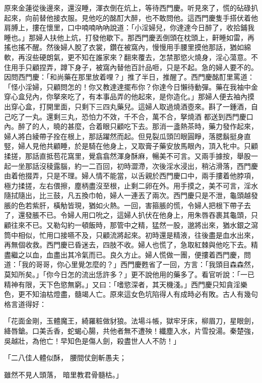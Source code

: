 原來金蓮從後邊來，還沒睡，渾衣倒在炕上，等待西門慶。听見來了，慌的砧碌扒起來，向前替他接衣服。見他吃的酩酊大醉，也不敢問他。這西門慶隻手搭伏着他肩膊上，摟在懷里，口中喃喃吶吶說道：「小淫婦兒，你達達今日醉了，收拾鋪我睡也。」那婦人扶他上炕，打發他歇下。那西門慶丟倒頭在枕頭上，鼾睡如雷，再搖也搖不醒。然後婦人脫了衣裳，鑽在被窩內，慢慢用手腰里摸他那話，猶如綿軟，再沒些硬朗氣，更不知在誰家來？翻來覆去，怎禁那慾火燒身，淫心蕩意。不住用手只顧捏弄，蹲下身子，被窩內替他百計品咂，只是不起。急的婦人要不的。因問西門慶：「和尚藥在那里放着哩？」推了半日，推醒了。西門慶酩酊里罵道：「怪小淫婦，只顧問怎的！你又教達達擺布你？你達今日懶待動彈。藥在我袖中金穿心盒兒內，你拏來吃了，有本事品弄的他起來，是你造化。」那婦人便去袖內摸出穿心盒，打開里面，只剩下三四丸藥兒。這婦人取過燒酒壺來。斟了一鍾酒，自己吃了一丸。還剩三丸，恐怕力不效，千不合，萬不合，拏燒酒 都送到西門慶口內。醉了的人，曉的甚麼，合着眼只顧吃下去。那消一盞熱茶時，藥力發作起來，婦人將白綾帶子拴在根上，那話躍然而起。但見裂瓜頭凹眼圓睜，落腮鬍挺身直竪，婦人見他共顧睡，於是騎在他身上，又取膏子藥安放馬眼內，頂入牝中。只顧揉搓，那話直抵苞花窩里，覺翕翕然渾身酥麻，暢美不可言。又兩手據按，舉股一起一坐那話沒稜露腦，約一二百回，初時澀滯，次後淫水浸出，稍沾滑落，西門慶由着他掇弄，只是不理。婦人情不能當，以舌親於西門慶口中，兩手摟着他脖項，極力揉搓，左右偎擦，塵柄盡沒至根，止剩二卵在外。用手摸之，美不可言，淫水隨拭隨出，比三鼓，凡五換巾帕，婦人一連丟了兩次。西門慶只是不泄，龜頭越發脹的色若紫肝，橫觔皆現，猶如火熱。一回，害箍脹的慌，令婦人把根下帶子去了，還發脹不已。令婦人用口吮之，這婦人扒伏在他身上，用朱唇吞裹其龜頭，只顧往來不已。又勒勾約一頓飯時，那管中之精，猛然一股，邈將出來，猶水銀之瀉筒中相似，忙用口接嚥不及，只顧流將起來。初時還是精液，往後盡是血水出來，再無個收救。西門慶已昏迷去，四肢不收。婦人也慌了，急取紅棘與他吃下去。精盡繼之以血，血盡出其冷氣而已。良久方止。婦人慌做一團，便摟着西門慶，問道：「我的哥哥，你心里覺怎麼的？」西門慶甦省了一回，方言：「我頭目森森然，莫知所矣。」「你今日怎的流出恁許多？」更不說他用的藥多了。看官听說：「一已精神有限，天下色慾無窮。」又曰：「嗜慾深者，其天機淺。」西門慶只知貪淫樂色，更不知油枯燈盡，髓竭人亡。原來這女色坑陷得人有成時必有敗。古人有幾句格言道得好：

「花面金剛，玉體魔王，綺羅粧做豺狼。法場斗帳，獄牢牙床，柳眉刀，星眼劍，絳唇鎗。口美舌香，蛇蝎心腸，共他者無不遭殃！纖塵入水，片雪投湯。秦楚強，吳越壯，為他亡！早知色是傷人劍，殺盡世人人不防！」

「二八佳人體似酥，  腰間仗劍斬愚夫；

雖然不見人頭落，  暗里教君骨髓枯。」

